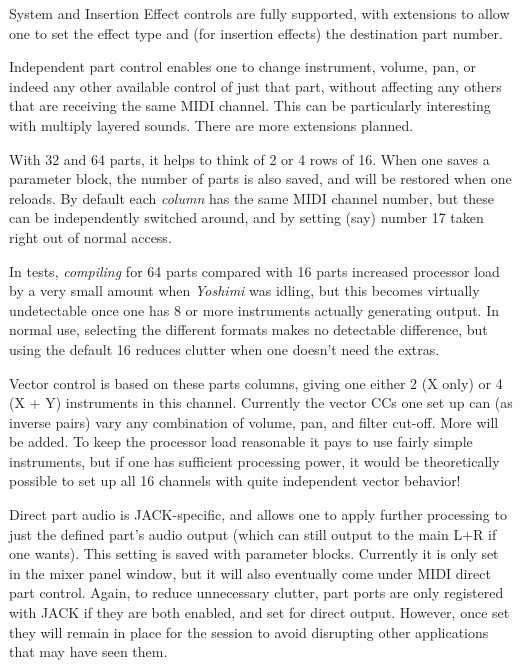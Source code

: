    System and Insertion Effect controls are fully supported, with extensions
   to allow one to set the effect type and (for insertion effects) the
   destination part number.

   Independent part control enables one to change instrument, volume, pan, or
   indeed any other available control of just that part, without affecting any
   others that are receiving the same MIDI channel. This can be particularly
   interesting with multiply layered sounds. There are more extensions planned.

   With 32 and 64 parts, it helps to think of 2 or 4 rows of 16. When one
   saves a parameter block, the number of parts is also saved, and will be
   restored when one reloads.  By default each \textsl{column} has the same
   MIDI channel number, but these can be independently switched around, and
   by setting (say) number 17 taken right out of normal access.

   In tests, \textsl{compiling} for 64 parts compared with 16 parts increased
   processor load by a very small amount when \textsl{Yoshimi} was idling,
   but this becomes virtually undetectable once one has 8 or more instruments
   actually generating output. In normal use, selecting the different formats
   makes no detectable difference, but using the default 16 reduces clutter
   when one doesn't need the extras.

   Vector control is based on these parts columns, giving one either 2 (X
   only) or 4 (X + Y) instruments in this channel. Currently the vector
   CCs one set up can (as inverse pairs) vary any combination of volume, pan,
   and filter cut-off.  More will be added.  To keep the processor load
   reasonable it pays to use fairly simple instruments, but if one has
   sufficient processing power, it would be theoretically possible to set up
   all 16 channels with quite independent vector behavior!

   Direct part audio is JACK-specific, and allows one to apply further
   processing to just the defined part's audio output (which can still output
   to the main L+R if one wants). This setting is saved with parameter
   blocks. Currently it is only set in the mixer panel window, but it will also
   eventually come under MIDI direct part control.  Again, to reduce
   unnecessary clutter, part ports are only registered with JACK if they are
   both enabled, and set for direct output. However, once set they will remain
   in place for the session to avoid disrupting other applications that may
   have seen them.


